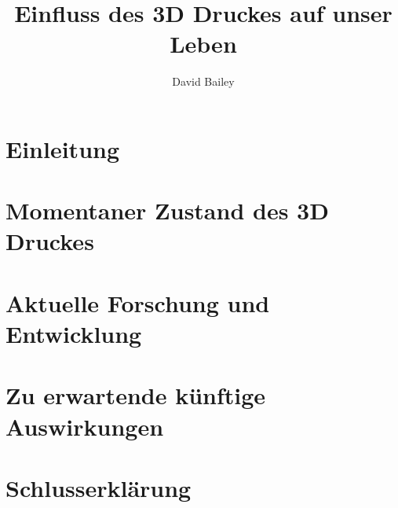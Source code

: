 \documentclass[11pt,a4paper]{article}
\author{David Bailey}
\title{Einfluss des 3D Druckes auf unser Leben}
\begin{document}
\onehalfspacing



\pagestyle{empty}
\tableofcontents

\newpage
\pagestyle{headings}
\section{Einleitung}


\newpage
\section{Momentaner Zustand des 3D Druckes}


\newpage
\section{Aktuelle Forschung und Entwicklung}


\newpage
\section{Zu erwartende künftige Auswirkungen}



\newpage

\printbibliography[heading=bibintoc]

\newpage
{}
\section*{Schlusserklärung}
\end{document}
